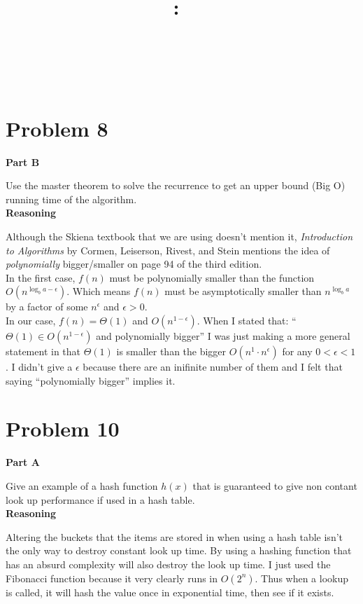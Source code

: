 \documentclass{article}
\title{
    \vspace{2in}
    \textmd{\textbf{\hmwkClass:\ \hmwkTitle}}\\
    \normalsize\vspace{0.1in}\small{\hmwkDueDate}\\
    \vspace{0.1in}\large{\textit{\hmwkClassInstructor\ \hmwkClassTime}}
    \vspace{3in}
}
\author{\textbf{\hmwkAuthorName}}
\date{}
\begin{document}
\maketitle

\pagebreak

\section{Problem 8}

\textbf{Part B}

Use the master theorem to solve the recurrence to get an upper bound (Big O)
running time of the algorithm.
\\

\textbf{Reasoning}

Although the Skiena textbook that we are using doesn't mention it,
\textit{Introduction to Algorithms} by Cormen, Leiserson, Rivest, and Stein
mentions the idea of \textit{polynomially} bigger/smaller on page 94 of the
third edition.
\\

In the first case, \(f(n)\) must be polynomially smaller than the function
\(O(n^{\log_b a - \epsilon})\). Which means \(f(n)\) must be asymptotically
smaller than \(n^{\log_b a}\) by a factor of some \(n^\epsilon\) and \(\epsilon >
0\).
\\

In our case, \(f(n) = \Theta(1)\) and \(O(n^{1 - \epsilon})\). When I stated that:
``\(\Theta(1) \in O(n^{1 - \epsilon})\) and polynomially bigger'' I was just making a more
general statement in that \(\Theta(1)\) is smaller than the bigger \(O(n^1
\cdot n^\epsilon)\) for any \(0 < \epsilon < 1\). I didn't give a \(\epsilon\)
because there are an inifinite number of them and I felt that saying
``polynomially bigger'' implies it.

\section{Problem 10}

\textbf{Part A}

Give an example of a hash function \(h(x)\) that is guaranteed to give non
contant look up performance if used in a hash table.
\\

\textbf{Reasoning}

Altering the buckets that the items are stored in when using a hash table isn't
the only way to destroy constant look up time. By using a hashing function that
has an absurd complexity will also destroy the look up time. I just used the
Fibonacci function because it very clearly runs in \(O(2^n)\). Thus when
a lookup is called, it will hash the value once in exponential time, then see
if it exists.
\end{document}
